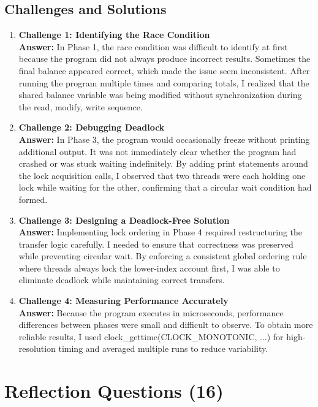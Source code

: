 \documentclass[12pt]{article}
\begin{document}
\subsection{Challenges and Solutions}
\begin{enumerate}

\item \textbf{Challenge 1: Identifying the Race Condition} \\
\textbf{Answer:} In Phase 1, the race condition was difficult to identify at first because the program did not
 always produce incorrect results. Sometimes the final balance appeared correct, which made the issue seem
 inconsistent. After running the program multiple times and comparing totals, I realized that the shared balance
 variable was being modified without synchronization during the read, modify, write sequence.

\item \textbf{Challenge 2: Debugging Deadlock} \\
\textbf{Answer:} In Phase 3, the program would occasionally freeze without printing additional output. It was not
 immediately clear whether the program had crashed or was stuck waiting indefinitely. By adding print statements
 around the lock acquisition calls, I observed that two threads were each holding one lock while waiting for the
 other, confirming that a circular wait condition had formed.

\item \textbf{Challenge 3: Designing a Deadlock-Free Solution} \\
\textbf{Answer:} Implementing lock ordering in Phase 4 required restructuring the transfer logic carefully. I
 needed to ensure that correctness was preserved while preventing circular wait. By enforcing a consistent global
 ordering rule where threads always lock the lower-index account first, I was able to eliminate deadlock while
 maintaining correct transfers.

\item \textbf{Challenge 4: Measuring Performance Accurately} \\
\textbf{Answer:} Because the program executes in microseconds, performance differences between phases were small
 and difficult to observe. To obtain more reliable results, I used clock\_gettime(CLOCK\_MONOTONIC, ...)
 for high-resolution timing and averaged multiple runs to reduce variability.
\end{enumerate}

\section{Reflection Questions (16)}
\end{document}
